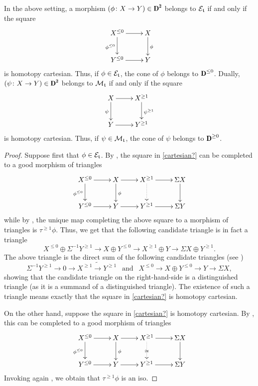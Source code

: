 \begin{lemma}\label{classes_via_cartesian}
In the above setting, a morphism $(\phi\colon X\to Y)\in\cD^\due$ belongs to $\mathcal{E}_{\mathfrak{t}}$ if and only if the  square
\begin{equation}\label{cartesian?}
\xymatrix{
X^{\leq0}\ar@{}[dr]\ar[r]^{}\ar[d]_{\phi^{\leq0}}&X\ar[d]^{\phi}\\
Y^{\leq0}\ar[r]_{}&Y
}
\end{equation}
is homotopy cartesian. Thus, if $\phi\in\mathcal{E}_{\mathfrak{t}}$, the cone of $\phi$  belongs to $ \cD^{\leq 0} $. Dually, $(\psi\colon X\to Y)\in\cD^\due$ belongs to $\mathcal{M}_{\mathfrak{t}}$ if and only if the square
\begin{equation*}
\xymatrix{
X\ar@{}[dr]\ar[r]^{}\ar[d]_{\psi}&X^{\geq1}\ar[d]^{\psi^{\geq1}}\\
Y\ar[r]_{}&Y^{\geq1}
}
\end{equation*}
is homotopy cartesian. Thus, if $\psi\in\mathcal{M}_{\mathfrak{t}}$, the cone of $\psi$ belongs to $ \cD^{\geq 0} $.
\end{lemma}
\begin{proof}
Suppose first that $\phi\in \mathcal{E}_{\mathfrak{t}}$. 
By \cite[Remark \textbf{1.3.15}]{Neeman}, the square in \eqref{cartesian?} can be completed to a good morphism of triangles
\[
\xymatrix{
X^{\leq0}\ar@{}[dr]\ar[r]^{}\ar[d]_{\phi^{\leq0}}&X\ar[d]^{\phi}\ar[r]&X^{\geq1}\ar[r]\ar@{.>}[d]&\Sigma X\ar[d]\\
Y^{\leq0}\ar[r]_{}&Y\ar[r]&Y^{\geq1}\ar[r]&\Sigma Y
}
\]
while by \cite[\aprop\textbf{1.1.9}]{BBD}, the unique map completing the above square to a morphism of triangles is $\tau^{\geq1}\phi$. Thus, we get that the following candidate triangle is in fact a triangle
\[
X^{\leq0}\oplus\Sigma^{-1}Y^{\geq1}\to X\oplus Y^{\leq0}\to X^{\geq1}\oplus Y\to \Sigma X\oplus Y^{\geq1}.
\]
The above triangle is the direct sum of the following candidate triangles (see \cite[Lemma \textbf{1.2.4}]{Neeman})
\[
\Sigma^{-1}Y^{\geq1}\to 0\to X^{\geq1}\tilde\to Y^{\geq1}\ \ \text{ and }\ \ X^{\leq0}\to X\oplus Y^{\leq0}\to Y\to \Sigma X,
\]
showing that the candidate triangle on the right-hand-side is a distinguished triangle (as it is a summand of a distinguished triangle). The existence of such a triangle means exactly that the square in \eqref{cartesian?}  is homotopy cartesian.

On the other hand, suppose the square in \eqref{cartesian?} is homotopy cartesian. By \cite[Remark \textbf{1.4.5}]{Neeman}, this can be completed to a good morphism of triangles
\[
\xymatrix{
X^{\leq0}\ar@{}[dr]\ar[r]^{}\ar[d]_{\phi^{\leq0}}&X\ar[d]^{\phi}\ar[r]&X^{\geq1}\ar[r]\ar@{.>}[d]|\cong&\Sigma X\ar[d]\\
Y^{\leq0}\ar[r]_{}&Y\ar[r]&Y^{\geq1}\ar[r]&\Sigma Y
}
\]
Invoking again  \cite[\aprop\textbf{1.1.9}]{BBD}, we obtain that $\tau^{\geq1}\phi$ is an iso.
\end{proof}
